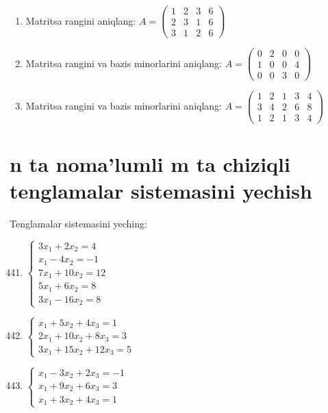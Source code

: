 \begin{enumerate}
\item Matritsa rangini aniqlang: $A=\begin{pmatrix}
	1&2&3&6\\2&3&1&6\\3&1&2&6
	\end{pmatrix}$

\item Matritsa rangini va bazis minorlarini aniqlang: $A=\begin{pmatrix}
	0&2&0&0\\1&0&0&4\\0&0&3&0
\end{pmatrix}$

\item Matritsa rangini va bazis minorlarini aniqlang: $A=\begin{pmatrix}
	1&2&1&3&4\\3&4&2&6&8\\1&2&1&3&4
\end{pmatrix}$
\end{enumerate}


\section{n ta noma'lumli m ta chiziqli tenglamalar sistemasini yechish}

Tenglamalar sistemasini yeching:
\begin{enumerate}\setcounter{enumi}{440}
	\item $\begin{cases}3x_1+2x_2=4\\
		x_1-4x_2=-1\\
		7x_1+10x_2=12\\
		5x_1+6x_2=8\\
		3x_1-16x_2=8
	\end{cases}$

\item $\begin{cases}
	x_1+5x_2+4x_3=1\\
	2x_1+10x_2+8x_3=3\\
	3x_1+15x_2+12x_3=5
\end{cases}$

\item $\begin{cases}
	x_1-3x_2+2x_3=-1\\
	x_1+9x_2+6x_3=3\\
	x_1+3x_2+4x_3=1
\end{cases}$
\end{enumerate}

